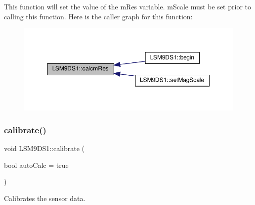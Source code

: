 This function will set the value of the m\+Res variable. m\+Scale must be set prior to calling this function. Here is the caller graph for this function\+:\nopagebreak
\begin{figure}[H]
\begin{center}
\leavevmode
\includegraphics[width=350pt]{classLSM9DS1_a830dfc95c7e2d8524720d78357b053cb_icgraph}
\end{center}
\end{figure}
\mbox{\label{classLSM9DS1_a97939cb15fcb7e33abcd6d3a9230d943}} 
\subsubsection{\texorpdfstring{calibrate()}{calibrate()}}
{\footnotesize\ttfamily void L\+S\+M9\+D\+S1\+::calibrate (\begin{DoxyParamCaption}\item[{bool}]{auto\+Calc = {\ttfamily true} }\end{DoxyParamCaption})}



Calibrates the sensor data. 


